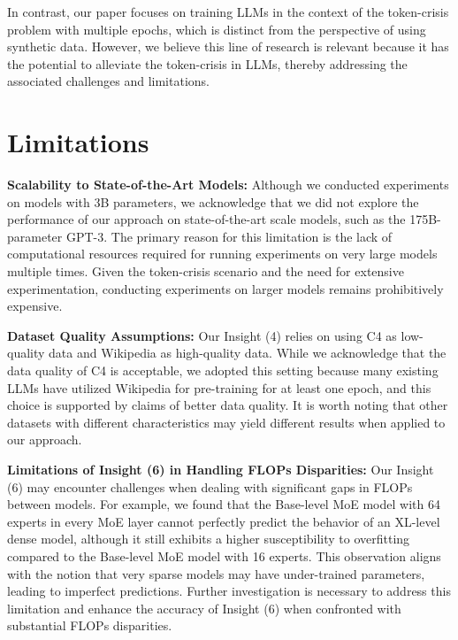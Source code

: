 \documentclass{article}
\begin{document}
In contrast, our paper focuses on training LLMs in the context of the token-crisis problem with multiple epochs, which is distinct from the perspective of using synthetic data. However, we believe this line of research is relevant because it has the potential to alleviate the token-crisis in LLMs, thereby addressing the associated challenges and limitations.


\section{Limitations}

\textbf{Scalability to State-of-the-Art Models:} Although we conducted experiments on models with 3B parameters, we acknowledge that we did not explore the performance of our approach on state-of-the-art scale models, such as the 175B-parameter GPT-3. The primary reason for this limitation is the lack of computational resources required for running experiments on very large models multiple times. Given the token-crisis scenario and the need for extensive experimentation, conducting experiments on larger models remains prohibitively expensive.

\textbf{Dataset Quality Assumptions:} Our Insight (4) relies on using C4 as low-quality data and Wikipedia as high-quality data. While we acknowledge that the data quality of C4 is acceptable, we adopted this setting because many existing LLMs have utilized Wikipedia for pre-training for at least one epoch, and this choice is supported by claims of better data quality. It is worth noting that other datasets with different characteristics may yield different results when applied to our approach.

\textbf{Limitations of Insight (6) in Handling FLOPs Disparities:}  Our Insight (6) may encounter challenges when dealing with significant gaps in FLOPs between models. For example, we found that the Base-level MoE model with 64 experts in every MoE layer cannot perfectly predict the behavior of an XL-level dense model, although it still exhibits a higher susceptibility to overfitting compared to the Base-level MoE model with 16 experts. This observation aligns with the notion that very sparse models may have under-trained parameters, leading to imperfect predictions. Further investigation is necessary to address this limitation and enhance the accuracy of Insight (6) when confronted with substantial FLOPs disparities.




\newpage
\end{document}
